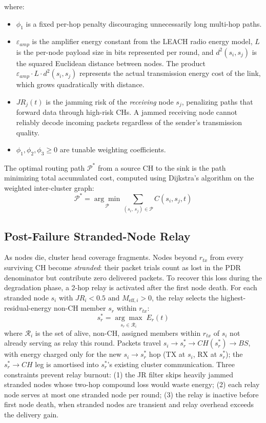 \documentclass[conference]{IEEEtran}
\begin{document}
where:
\vspace{2pt}
\begin{itemize}
    \item $\phi_1$ is a fixed per-hop penalty discouraging unnecessarily
    long multi-hop paths.
    \item $\varepsilon_{amp}$ is the amplifier energy constant from the
    LEACH radio energy model, $L$ is the per-node payload size in bits
    represented per round, and
    $d^2(s_i, s_j)$ is the squared Euclidean distance between nodes.
    The product $\varepsilon_{amp} \cdot L \cdot d^2(s_i,s_j)$ represents
    the actual transmission energy cost of the link, which grows
    quadratically with distance.
    \item $JR_j(t)$ is the jamming risk of the \textit{receiving} node
    $s_j$, penalizing paths that forward data through high-risk CHs. A
    jammed receiving node cannot reliably decode incoming packets
    regardless of the sender's transmission quality.
    \item $\phi_1, \phi_2, \phi_3 \geq 0$ are tunable weighting
    coefficients.
\end{itemize}

The optimal routing path $\mathcal{P}^*$ from a source CH to the sink is
the path minimizing total accumulated cost, computed using Dijkstra's
algorithm on the weighted inter-cluster graph:
\begin{equation}
    \mathcal{P}^* = \underset{\mathcal{P}}{\arg\min}
    \sum_{(s_i,\, s_j) \in \mathcal{P}} C(s_i, s_j, t)
\end{equation}

\subsection{Post-Failure Stranded-Node Relay}

As nodes die, cluster head coverage fragments. Nodes beyond $r_{tx}$
from every surviving CH become \textit{stranded}: their packet trials
count as lost in the PDR denominator but contribute zero delivered
packets. To recover this loss during the degradation phase, a 2-hop
relay is activated after the first node death. For each stranded node
$s_i$ with $JR_i < 0.5$ and $M_{\text{eff},i} > 0$, the relay selects
the highest-residual-energy non-CH member $s_r$ within $r_{tx}$:
\begin{equation}
    s_r^* = \underset{s_r \in \mathcal{R}_i}{\arg\max}\; E_r(t)
\end{equation}
where $\mathcal{R}_i$ is the set of alive, non-CH, assigned members
within $r_{tx}$ of $s_i$ not already serving as relay this round.
Packets travel $s_i \to s_r^* \to CH(s_r^*) \to BS$, with energy
charged only for the new $s_i \to s_r^*$ hop (TX at $s_i$, RX at
$s_r^*$); the $s_r^* \to CH$ leg is amortised into $s_r^*$'s existing
cluster communication. Three constraints prevent relay burnout: (1)
the JR filter skips heavily jammed stranded nodes whose two-hop compound
loss would waste energy; (2) each relay node serves at most one stranded
node per round; (3) the relay is inactive before first node death, when
stranded nodes are transient and relay overhead exceeds the delivery gain.
\end{document}
